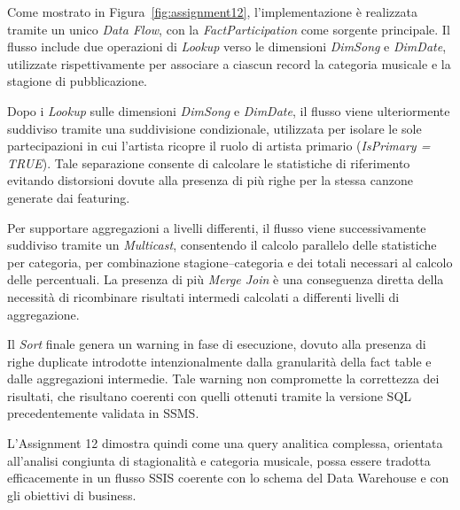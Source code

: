Come mostrato in Figura~\ref{fig:assignment12}, l’implementazione è realizzata tramite un unico \textit{Data Flow}, con la \textit{FactParticipation} come sorgente principale. Il flusso include due operazioni di \textit{Lookup} verso le dimensioni \textit{DimSong} e \textit{DimDate}, utilizzate rispettivamente per associare a ciascun record la categoria musicale e la stagione di pubblicazione.

Dopo i \textit{Lookup} sulle dimensioni \textit{DimSong} e \textit{DimDate}, il flusso viene ulteriormente suddiviso tramite una suddivisione condizionale, utilizzata per isolare le sole partecipazioni in cui l’artista ricopre il ruolo di artista primario (\textit{IsPrimary = TRUE}). Tale separazione consente di calcolare le statistiche di riferimento evitando distorsioni dovute alla presenza di più righe per la stessa canzone generate dai featuring.

Per supportare aggregazioni a livelli differenti, il flusso viene successivamente suddiviso tramite un \textit{Multicast}, consentendo il calcolo parallelo delle statistiche per categoria, per combinazione stagione--categoria e dei totali necessari al calcolo delle percentuali. La presenza di più \textit{Merge Join} è una conseguenza diretta della necessità di ricombinare risultati intermedi calcolati a differenti livelli di aggregazione.

Il \textit{Sort} finale genera un warning in fase di esecuzione, dovuto alla presenza di righe duplicate introdotte intenzionalmente dalla granularità della fact table e dalle aggregazioni intermedie. Tale warning non compromette la correttezza dei risultati, che risultano coerenti con quelli ottenuti tramite la versione SQL precedentemente validata in SSMS.

L’Assignment 12 dimostra quindi come una query analitica complessa, orientata all’analisi congiunta di stagionalità e categoria musicale, possa essere tradotta efficacemente in un flusso SSIS coerente con lo schema del Data Warehouse e con gli obiettivi di business.
